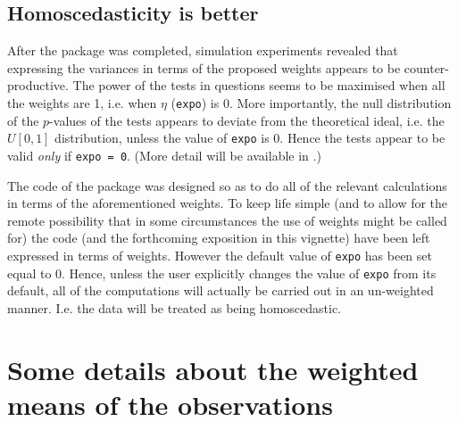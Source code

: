 \documentclass[12pt]{article}
\begin{document}
\subsection{Homoscedasticity is better}

After the package was completed, simulation experiments revealed
that expressing the variances in terms of the proposed weights
appears to be counter-productive.  The power of the tests in
questions seems to be maximised when all the weights are 1,
i.e. when $\eta$ (\texttt{expo}) is 0.  More importantly, the null
distribution of the $p$-values of the tests appears to deviate from
the theoretical ideal, i.e. the $U[0,1]$ distribution, unless the
value of \texttt{expo} is 0.  Hence the tests appear to be valid
\emph{only} if \texttt{expo = 0}.  (More detail will be available
in \cite{DiggleTurner2025}.)

The code of the package was designed so as to do all of the
relevant calculations in terms of the aforementioned weights.
To keep life simple (and to allow for the remote possibility that
in some circumstances the use of weights might be called for) the
code (and the forthcoming exposition in this vignette) have been
left expressed in terms of weights.  However the default value
of \texttt{expo} has been set equal to 0.  Hence, unless the user
explicitly changes the value of \texttt{expo} from its default, all
of the computations will actually be carried out in an un-weighted
manner.  I.e. the data will be treated as being homoscedastic.

\section{Some details about the weighted means of the observations}
\label{sec:wtdMeans}
\end{document}
